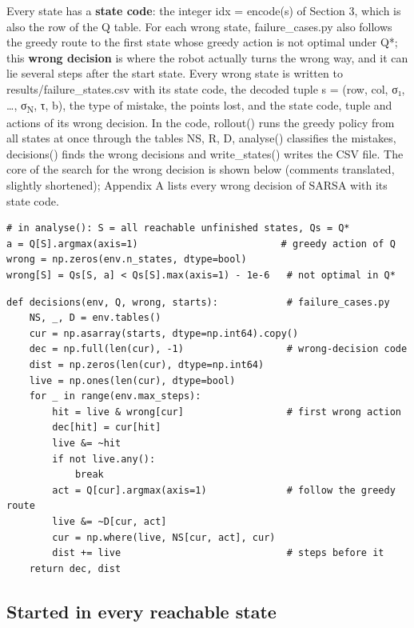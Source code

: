 \documentclass[12pt,a4paper]{article}
\begin{document}
Every state has a \textbf{state code}: the integer idx = encode(s) of
Section 3, which is also the row of the Q table. For each wrong state,
failure\_cases.py also follows the greedy route to the first state whose
greedy action is not optimal under Q*; this \textbf{wrong decision} is
where the robot actually turns the wrong way, and it can lie several
steps after the start state. Every wrong state is written to
results/failure\_states.csv with its state code, the decoded tuple s =
(row, col, σ₁, \ldots, σ\textsubscript{N}, τ, b), the type of mistake,
the points lost, and the state code, tuple and actions of its wrong
decision. In the code, rollout() runs the greedy policy from all states
at once through the tables NS, R, D, analyse() classifies the mistakes,
decisions() finds the wrong decisions and write\_states() writes the CSV
file. The core of the search for the wrong decision is shown below
(comments translated, slightly shortened); Appendix A lists every wrong
decision of SARSA with its state code.

\begin{lstlisting}
# in analyse(): S = all reachable unfinished states, Qs = Q*
a = Q[S].argmax(axis=1)                         # greedy action of Q
wrong = np.zeros(env.n_states, dtype=bool)
wrong[S] = Qs[S, a] < Qs[S].max(axis=1) - 1e-6   # not optimal in Q*
\end{lstlisting}

\begin{lstlisting}
def decisions(env, Q, wrong, starts):            # failure_cases.py
    NS, _, D = env.tables()
    cur = np.asarray(starts, dtype=np.int64).copy()
    dec = np.full(len(cur), -1)                  # wrong-decision code
    dist = np.zeros(len(cur), dtype=np.int64)
    live = np.ones(len(cur), dtype=bool)
    for _ in range(env.max_steps):
        hit = live & wrong[cur]                  # first wrong action
        dec[hit] = cur[hit]
        live &= ~hit
        if not live.any():
            break
        act = Q[cur].argmax(axis=1)              # follow the greedy route
        live &= ~D[cur, act]
        cur = np.where(live, NS[cur, act], cur)
        dist += live                             # steps before it
    return dec, dist
\end{lstlisting}

\hypertarget{started-in-every-reachable-state}{%
\subsection{Started in every reachable
state}\label{started-in-every-reachable-state}}
\end{document}
